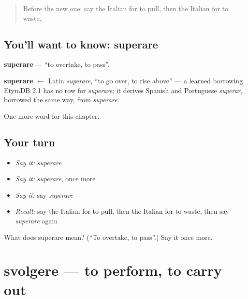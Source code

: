 \label{lesson:IT-C240-superare}



\begin{quote}
Before the new one: say the Italian for to pull, then the Italian for to waste.
\end{quote}

\subsection*{You'll want to know: superare}
\textbf{superare} — \textquotedblleft{}to overtake, to pass\textquotedblright{}.

\begin{cousinweb}
\textbf{superare} $\leftarrow$ Latin \emph{superare}, \textquotedblleft{}to go over, to rise above\textquotedblright{} — a learned borrowing. EtymDB 2.1 has no row for \emph{superare}; it derives Spanish and Portuguese \emph{superar}, borrowed the same way, from \emph{superare}.
\end{cousinweb}

\begin{grammarlens}[title={What you've built}]
One more word for this chapter.
\end{grammarlens}

\subsection*{Your turn}
\begin{itemize}
\raggedright
  \item \emph{Say it:} \emph{superare}
  \item \emph{Say it:} \emph{superare}, once more
  \item \emph{Say it:} say \emph{superare}
  \item \emph{Recall:} say the Italian for to pull, then the Italian for to waste, then say \emph{superare} again
\end{itemize}

\begin{tcolorbox}[breakable,colback=teal!4,colframe=teal!35!black,title={Before you move on}]
What does superare mean? (\textquotedblleft{}To overtake, to pass\textquotedblright{}.) Say it once more.
\end{tcolorbox}
\section[svolgere]{svolgere — to perform, to carry out}

